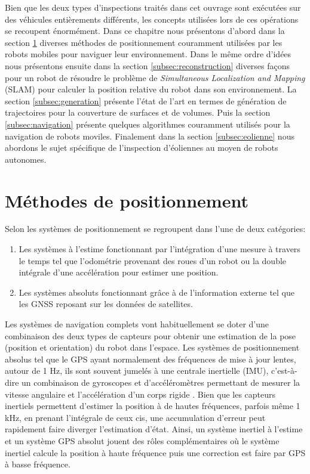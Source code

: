 \label{sec:RevLitt}

Bien que les deux types d'inspections traités dans cet ouvrage sont exécutées sur des véhicules entièrements différents, les concepts utilisées lors de ces opérations se recoupent énormément. Dans ce chapitre nous présentons d'abord dans la section \ref{subsec:positionnement} diverses méthodes de positionnement couramment utilisées par les robots mobiles pour naviguer leur environnement. Dans le même ordre d'idées nous présentons ensuite dans la section \ref{subsec:reconstruction} diverses façons pour un robot de résoudre le problème de \textit{Simultaneous Localization and Mapping} (SLAM) pour calculer la position relative du robot dans son environnement. La section \ref{subsec:generation} présente l'état de l'art en termes de génération de trajectoires pour la couverture de surfaces et de volumes. Puis la section \ref{subsec:navigation} présente quelques algorithmes couramment utilisés pour la navigation de robots moviles. Finalement dans la section \ref{subsec:eolienne} nous abordons le sujet spécifique de l'inspection d'éoliennes au moyen de robots autonomes.

\section{Méthodes de positionnement}\label{subsec:positionnement}

Selon \citep{Borenstein1997} les systèmes de positionnement se regroupent dans l'une de deux catégories:

\begin{enumerate}
  \item Les systèmes à l'estime fonctionnant par l'intégration d'une mesure à travers le temps tel que l'odométrie provenant des roues d'un robot ou la double intégrale d'une accélération pour estimer une position.
  \item Les systèmes absoluts fonctionnant grâce à de l'information externe tel que les GNSS reposant sur les données de satellites.
\end{enumerate}

Les systèmes de navigation complets vont habituellement se doter d'une combinaison des deux types de capteurs pour obtenir une estimation de la pose (position et orientation) du robot dans l'espace. Les systèmes de positionnement absolus tel que le GPS ayant normalement des fréquences de mise à jour lentes, autour de 1 Hz, ils sont souvent jumelés à une centrale inertielle (IMU), c'est-à-dire un combinaison de gyroscopes et d'accéléromètres permettant de mesurer la vitesse angulaire et l'accélération d'un corps rigide \citep{Noureldin2013}. Bien que les capteurs inertiels permettent d'estimer la position à de hautes fréquences, parfois même 1 kHz, en prenant l'intégrale de ceux cis, une accumulation d'erreur peut rapidement faire diverger l'estimation d'état. Ainsi, un système inertiel à l'estime et un système GPS absolut jouent des rôles complémentaires où le système inertiel calcule la position à haute fréquence puis une correction est faire par GPS à basse fréquence.

